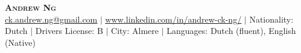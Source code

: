 \documentclass[letterpaper,11pt]{article}
\begin{document}

\begin{center}
    \textbf{\Huge \scshape Andrew Ng} \\ \vspace{1pt}
    \href{mailto:x@x.com}{\underline{ck.andrew.ng@gmail.com}} $|$ 
    \href{https://linkedin.com/in/...}{\underline{www.linkedin.com/in/andrew-ck-ng/}} $|$
    \small Nationality: Dutch $|$ 
    {\small{Drivers License: B}} $|$  {\small{City: Almere}} $|$  
    {\small{Languages: Dutch (fluent), English (Native) }}
\end{center}

\end{document}
